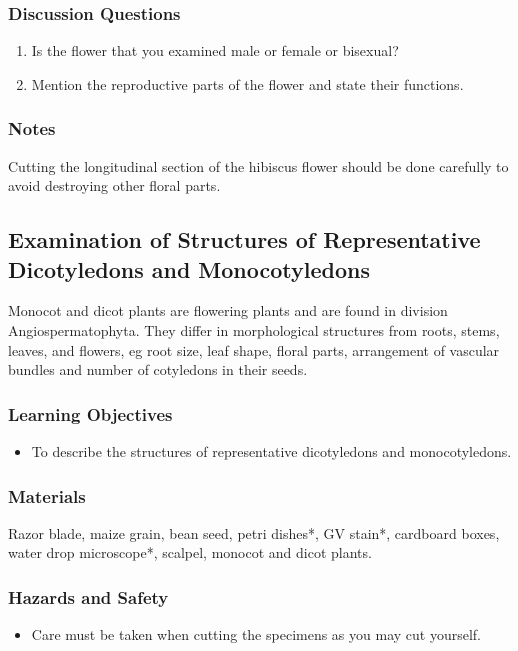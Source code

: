 \subsubsection*{Discussion Questions}
\begin{enumerate}
\item{Is the flower that you examined male or female or bisexual?}
\item{Mention the reproductive parts of the flower and state their functions.}
\end{enumerate}

\subsubsection*{Notes}
Cutting the longitudinal section of the hibiscus flower should be done carefully to avoid destroying other floral parts. 
 
\subsection{Examination of Structures of Representative Dicotyledons and Monocotyledons}
Monocot and dicot plants are flowering plants and are found in division Angiospermatophyta. They differ in morphological structures from roots, stems, leaves, and flowers, eg root size, leaf shape, floral parts, arrangement of vascular bundles and number of cotyledons in their seeds.

\subsubsection*{Learning Objectives}
\begin{itemize}
\item{To describe the structures of representative dicotyledons and monocotyledons.}
\end{itemize}

\subsubsection*{Materials}
Razor blade, maize grain, bean seed, petri dishes*, GV stain*, cardboard boxes, water drop microscope*, scalpel, monocot and dicot plants.

\subsubsection*{Hazards and Safety}
\begin{itemize}
\item{Care must be taken when cutting the specimens as you may cut yourself.}
\end{itemize}

